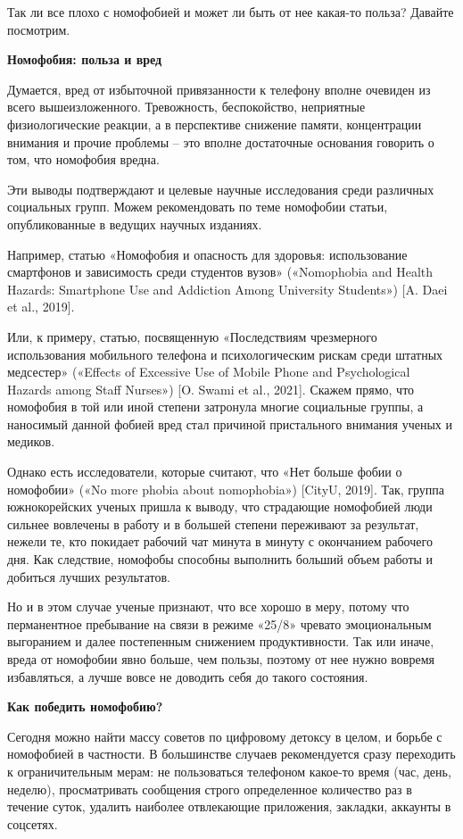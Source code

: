 Так ли все плохо с номофобией и может ли быть от нее какая-то польза? Давайте посмотрим.

\textbf{Номофобия: польза и вред}

Думается, вред от избыточной привязанности к телефону вполне очевиден из всего вышеизложенного. Тревожность, беспокойство, неприятные физиологические реакции, а в перспективе снижение памяти, концентрации внимания и прочие проблемы – это вполне достаточные основания говорить о том, что номофобия вредна.

Эти выводы подтверждают и целевые научные исследования среди различных социальных групп. Можем рекомендовать по теме номофобии статьи, опубликованные в ведущих научных изданиях.

Например, статью «Номофобия и опасность для здоровья: использование смартфонов и зависимость среди студентов вузов» («Nomophobia and Health Hazards: Smartphone Use and Addiction Among University Students») [A. Daei et al., 2019].

Или, к примеру, статью, посвященную «Последствиям чрезмерного использования мобильного телефона и психологическим рискам среди штатных медсестер» («Effects of Excessive Use of Mobile Phone and Psychological Hazards among Staff Nurses») [O. Swami et al., 2021]. Скажем прямо, что номофобия в той или иной степени затронула многие социальные группы, а наносимый данной фобией вред стал причиной пристального внимания ученых и медиков.

Однако есть исследователи, которые считают, что «Нет больше фобии о номофобии» («No more phobia about nomophobia») [CityU, 2019]. Так, группа южнокорейских ученых пришла к выводу, что страдающие номофобией люди сильнее вовлечены в работу и в большей степени переживают за результат, нежели те, кто покидает рабочий чат минута в минуту с окончанием рабочего дня. Как следствие, номофобы способны выполнить больший объем работы и добиться лучших результатов.

Но и в этом случае ученые признают, что все хорошо в меру, потому что перманентное пребывание на связи в режиме «25/8» чревато эмоциональным выгоранием и далее постепенным снижением продуктивности. Так или иначе, вреда от номофобии явно больше, чем пользы, поэтому от нее нужно вовремя избавляться, а лучше вовсе не доводить себя до такого состояния.

\textbf{Как победить номофобию?}

Сегодня можно найти массу советов по цифровому детоксу в целом, и борьбе с номофобией в частности. В большинстве случаев рекомендуется сразу переходить к ограничительным мерам: не пользоваться телефоном какое-то время (час, день, неделю), просматривать сообщения строго определенное количество раз в течение суток, удалить наиболее отвлекающие приложения, закладки, аккаунты в соцсетях.

